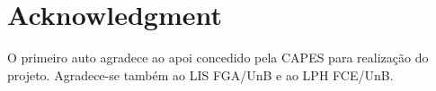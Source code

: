 \documentclass[journal]{IEEEtran}
\begin{document}



\section*{Acknowledgment}

O primeiro auto agradece ao apoi concedido pela CAPES para realização do projeto.
Agradece-se também ao LIS FGA/UnB e ao LPH FCE/UnB.




\ifCLASSOPTIONcaptionsoff
  \newpage
\fi







%


% 
\end{document}
